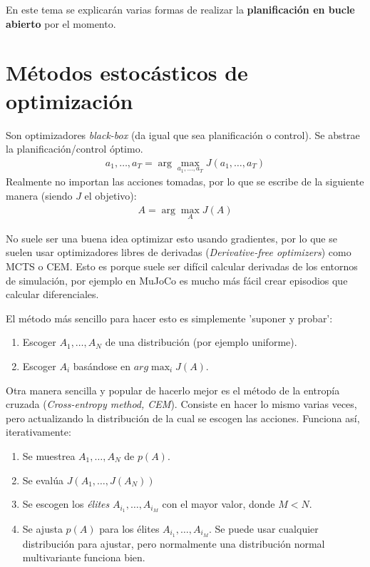 En este tema se explicarán varias formas de realizar la \textbf{planificación
en bucle abierto} por el momento.

\section{Métodos estocásticos de optimización}%
\label{sec:métodos_estocásticos_de_optimización}

Son optimizadores \textit{black-box} (da igual que sea planificación o control). Se abstrae
la planificación/control óptimo.
\begin{align}
a _ { 1 } , \ldots , a _ { T } = \operatorname { arg } \operatorname { max } _ { a _ { 1 } , \ldots , a _ { T } } J ( a _ { 1 } , \ldots , a _ { T } )
\end{align}
Realmente no importan las acciones tomadas, por lo que se escribe de la siguiente manera
(siendo $J$ el objetivo):
\begin{align}
A = \operatorname { arg } \operatorname { max } _ { A } J ( A )
\end{align}

No suele ser una buena idea optimizar esto usando gradientes, por lo que se suelen usar
optimizadores libres de derivadas (\textit{Derivative-free optimizers}) como MCTS o CEM. Esto es
porque suele ser difícil calcular derivadas de los entornos de simulación, por ejemplo en
MuJoCo es mucho más fácil crear episodios que calcular diferenciales.

El método más sencillo para hacer esto es simplemente 'suponer y probar':
\begin{enumerate}
    \item Escoger $A_1,\ldots,A_N$ de una distribución (por ejemplo uniforme).
    \item Escoger $A_i$ basándose en  $arg\max_iJ(A)$.
\end{enumerate}

Otra manera sencilla y popular de hacerlo mejor es el método de la entropía cruzada
(\textit{Cross-entropy method, CEM}). Consiste en hacer lo mismo varias veces, pero
actualizando la distribución de la cual se escogen las acciones. Funciona así, iterativamente:
\begin{enumerate}
    \item Se muestrea $ A_1, \ldots,A_N$ de $ p(A)$.
    \item Se evalúa $J(A_1,\ldots,J(A_N))$
    \item Se escogen los \textit{élites} $A_{i_1},\ldots,A_{i_M}$ con el mayor valor, donde
         $M<N$.
     \item Se ajusta $p(A)$ para los élites $A_{i_1},\ldots,A_{i_M}$. Se puede usar cualquier
         distribución para ajustar, pero normalmente una distribución normal multivariante
         funciona bien.
\end{enumerate}

